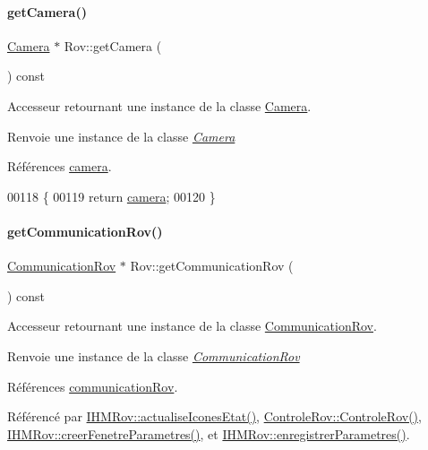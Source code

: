 \paragraph{\texorpdfstring{get\+Camera()}{getCamera()}}
{\footnotesize\ttfamily \hyperlink{class_camera}{Camera} $\ast$ Rov\+::get\+Camera (\begin{DoxyParamCaption}{ }\end{DoxyParamCaption}) const}

Accesseur retournant une instance de la classe \hyperlink{class_camera}{Camera}.

\begin{DoxyReturn}{Renvoie}
une instance de la classe {\itshape \hyperlink{class_camera}{Camera}} 
\end{DoxyReturn}


Références \hyperlink{class_rov_ad0461ecece812497ee9b4a962f168c18}{camera}.


\begin{DoxyCode}
00118 \{
00119     \textcolor{keywordflow}{return} \hyperlink{class_rov_ad0461ecece812497ee9b4a962f168c18}{camera};
00120 \}
\end{DoxyCode}
\mbox{\label{class_rov_ad30543625f584e28bf785a80c59506dc}} 
\paragraph{\texorpdfstring{get\+Communication\+Rov()}{getCommunicationRov()}}
{\footnotesize\ttfamily \hyperlink{class_communication_rov}{Communication\+Rov} $\ast$ Rov\+::get\+Communication\+Rov (\begin{DoxyParamCaption}{ }\end{DoxyParamCaption}) const}

Accesseur retournant une instance de la classe \hyperlink{class_communication_rov}{Communication\+Rov}.

\begin{DoxyReturn}{Renvoie}
une instance de la classe {\itshape \hyperlink{class_communication_rov}{Communication\+Rov}} 
\end{DoxyReturn}


Références \hyperlink{class_rov_a8e7aaa17ee2134f26d57241d11ab2a99}{communication\+Rov}.



Référencé par \hyperlink{class_i_h_m_rov_abbfcdc154a6ae7f941d186f6c90a5a2b}{I\+H\+M\+Rov\+::actualise\+Icones\+Etat()}, \hyperlink{class_controle_rov_acc4d5fea26770217df978d43df2ad51e}{Controle\+Rov\+::\+Controle\+Rov()}, \hyperlink{class_i_h_m_rov_aed451139ac09ef18b7c92637761d80ce}{I\+H\+M\+Rov\+::creer\+Fenetre\+Parametres()}, et \hyperlink{class_i_h_m_rov_a94d31f4e748f3e4549eab42c8bc7e367}{I\+H\+M\+Rov\+::enregistrer\+Parametres()}.


